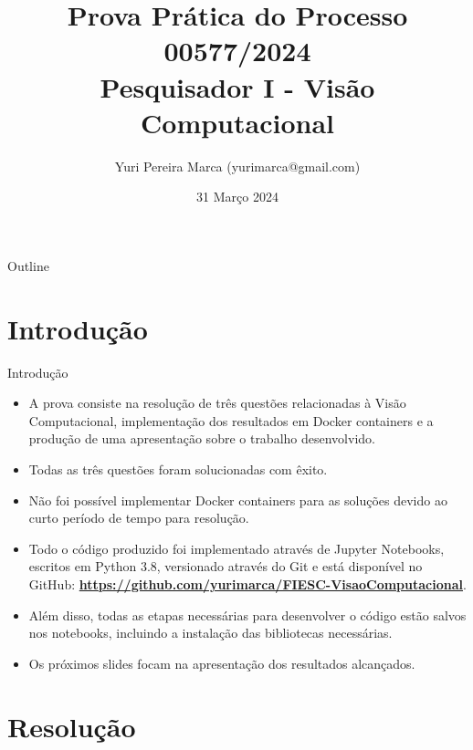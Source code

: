 \documentclass[xcolor=dvipsnames]{beamer}
\title{Prova Prática do Processo 00577/2024 \\ Pesquisador I - Visão Computacional}
\author{Yuri Pereira Marca (yurimarca@gmail.com)}
\date{31 Março 2024}
\begin{document}
	
	\begin{frame}
		\titlepage
	\end{frame}
	
	\begin{frame}{Outline}
		\tableofcontents
	\end{frame}
	

	\section{Introdução}
	\begin{frame}{Introdução}
		\begin{itemize}
			\item A prova consiste na resolução de três questões relacionadas à Visão Computacional, implementação dos resultados em Docker containers e a produção de uma apresentação sobre o trabalho desenvolvido.
			\item Todas as três questões foram solucionadas com êxito.
			\item Não foi possível implementar Docker containers para as soluções devido ao curto período de tempo para resolução.
			\item Todo o código produzido foi implementado através de Jupyter Notebooks, escritos em Python 3.8, versionado através do Git e está disponível no GitHub: \href{https://github.com/yurimarca/FIESC-VisaoComputacional/}{\textbf{https://github.com/yurimarca/FIESC-VisaoComputacional}}.
			\item Além disso, todas as etapas necessárias para desenvolver o código estão salvos nos notebooks, incluindo a instalação das bibliotecas necessárias.
			\item Os próximos slides focam na apresentação dos resultados alcançados.
		\end{itemize}
	\end{frame}

	\section{Resolução}
\end{document}
